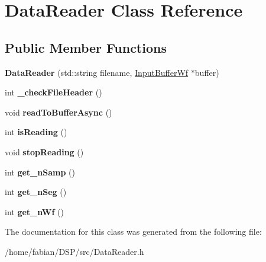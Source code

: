 \hypertarget{classDataReader}{\section{Data\-Reader Class Reference}
\label{classDataReader}
}
\subsection*{Public Member Functions}
\begin{DoxyCompactItemize}
\item 
\hypertarget{classDataReader_a6ee3b4ab03a6c8275c609427d779c490}{{\bfseries Data\-Reader} (std\-::string filename, \hyperlink{classRingbuffer}{Input\-Buffer\-Wf} $\ast$buffer)}\label{classDataReader_a6ee3b4ab03a6c8275c609427d779c490}

\item 
\hypertarget{classDataReader_aa53ed71dd3a6220e8f6d7d3f3db31ade}{int {\bfseries \-\_\-check\-File\-Header} ()}\label{classDataReader_aa53ed71dd3a6220e8f6d7d3f3db31ade}

\item 
\hypertarget{classDataReader_ae657eb3b65c75418f21ba9f03ac12b13}{void {\bfseries read\-To\-Buffer\-Async} ()}\label{classDataReader_ae657eb3b65c75418f21ba9f03ac12b13}

\item 
\hypertarget{classDataReader_a8a5bf454b34839d63e5d0c6ca7573682}{int {\bfseries is\-Reading} ()}\label{classDataReader_a8a5bf454b34839d63e5d0c6ca7573682}

\item 
\hypertarget{classDataReader_a4d153d457d8121a14386050a5a5618ce}{void {\bfseries stop\-Reading} ()}\label{classDataReader_a4d153d457d8121a14386050a5a5618ce}

\item 
\hypertarget{classDataReader_a8ada95ad5aca5fbb3e50f0b6a954a623}{int {\bfseries get\-\_\-n\-Samp} ()}\label{classDataReader_a8ada95ad5aca5fbb3e50f0b6a954a623}

\item 
\hypertarget{classDataReader_a94f681f6c77c9ad57c09b26fc367084b}{int {\bfseries get\-\_\-n\-Seg} ()}\label{classDataReader_a94f681f6c77c9ad57c09b26fc367084b}

\item 
\hypertarget{classDataReader_ad754d5ff3d2e833aaabf9460f47a77e4}{int {\bfseries get\-\_\-n\-Wf} ()}\label{classDataReader_ad754d5ff3d2e833aaabf9460f47a77e4}

\end{DoxyCompactItemize}


The documentation for this class was generated from the following file\-:\begin{DoxyCompactItemize}
\item 
/home/fabian/\-D\-S\-P/src/Data\-Reader.\-h\end{DoxyCompactItemize}
